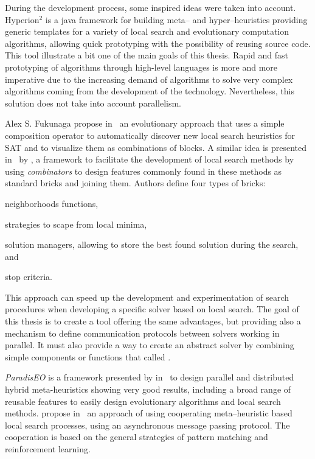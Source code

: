 During the development process, some inspired ideas were taken into account. {\sc Hyperion}$^2$ \cite{Brownlee2014} is a java framework for building meta-- and hyper--heuristics providing generic templates for a variety of local search and evolutionary computation algorithms, allowing quick prototyping with the possibility of reusing source code. This tool illustrate a bit one of the main goals of this thesis. Rapid and fast prototyping of algorithms through high-level languages is more and more imperative due to the increasing demand of algorithms to solve very complex algorithms coming from the development of the technology. Nevertheless, this solution does not take into account parallelism.

Alex S. Fukunaga propose in~\cite{Fukunaga2008} an evolutionary approach that uses a simple composition operator to automatically discover new local search heuristics for SAT and to visualize them as combinations of blocks. A similar idea is presented in~\cite{Landtsheer2015} by , a framework to facilitate the development of local search methods by using \textit{combinators} to design features commonly found in these methods as standard bricks and joining them. Authors define four types of bricks: \begin{inparaenum}[1-] \item neighborhoods functions, \item strategies to scape from local minima, \item solution managers, allowing to store the best found solution during the search, and \item stop criteria.
\end{inparaenum} This approach can speed up the development and experimentation of search procedures when developing a specific solver based on local search. The goal of this thesis is to create a tool offering the same advantages, but providing also a mechanism to define communication protocols between solvers working in parallel. It must also provide a way to create an abstract solver by combining simple components or functions that called \ms.

{\it ParadisEO} is a framework presented by  in~\cite{Cahon2004} to design parallel and distributed hybrid meta-heuristics showing very good results, including a broad range of reusable features to easily design evolutionary algorithms and local search methods.  propose in~\cite{Martin2016} an approach of using cooperating meta--heuristic based local search processes, using an asynchronous message passing protocol. The cooperation is based on the general strategies of pattern matching and reinforcement learning. 

